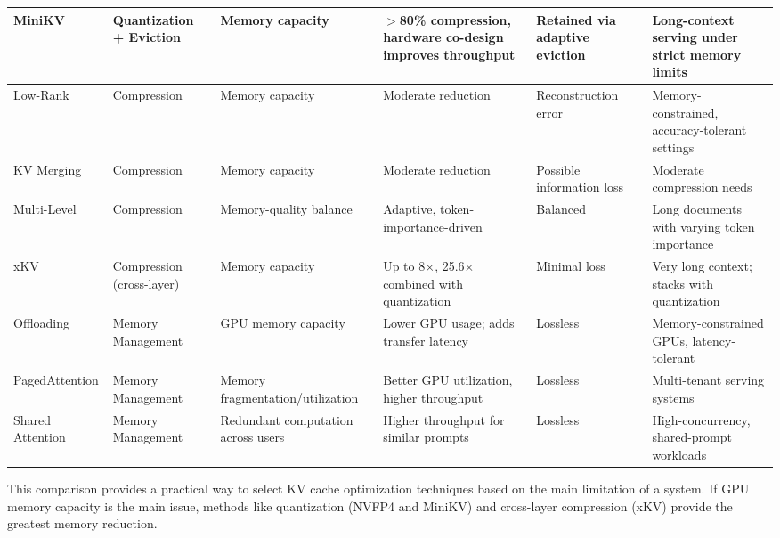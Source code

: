 \documentclass[conference]{IEEEtran}
\begin{document}
\begin{table}[htbp]
\begin{tabularx}{\linewidth}{llXXXX}
		MiniKV             & Quantization + Eviction   & Memory capacity                          & $>$80\% compression, hardware co-design improves throughput   & Retained via adaptive eviction    & Long-context serving under strict memory limits          \\
		\midrule
		Low-Rank           & Compression               & Memory capacity                          & Moderate reduction                                            & Reconstruction error              & Memory-constrained, accuracy-tolerant settings           \\
		KV Merging         & Compression               & Memory capacity                          & Moderate reduction                                            & Possible information loss         & Moderate compression needs                               \\
		Multi-Level        & Compression               & Memory-quality balance                   & Adaptive, token-importance-driven                             & Balanced                          & Long documents with varying token importance             \\
		xKV                & Compression (cross-layer) & Memory capacity                          & Up to 8$\times$, 25.6$\times$ combined with quantization      & Minimal loss                      & Very long context; stacks with quantization              \\
		\midrule
		Offloading         & Memory Management         & GPU memory capacity                      & Lower GPU usage; adds transfer latency                        & Lossless                          & Memory-constrained GPUs, latency-tolerant                \\
		PagedAttention     & Memory Management         & Memory fragmentation/utilization         & Better GPU utilization, higher throughput                     & Lossless                          & Multi-tenant serving systems                             \\
		Shared Attention   & Memory Management         & Redundant computation across users       & Higher throughput for similar prompts                         & Lossless                          & High-concurrency, shared-prompt workloads                \\
		\bottomrule
	\end{tabularx}
\end{table}

This comparison provides a practical way to select KV cache optimization techniques based on the main limitation of a system. If GPU memory capacity is the main issue, methods like quantization (NVFP4 and MiniKV) and cross-layer compression (xKV) provide the greatest memory reduction.
\end{document}
